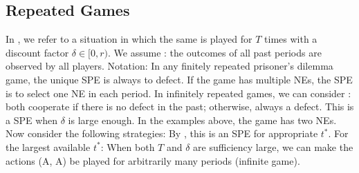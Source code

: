 \documentclass[10pt]{report}
\begin{document}
\subsection{Repeated Games}

In , we refer to a situation in which the same  is played for $T$ times with a discount factor $\delta\in[0,r)$. 
We assume : the outcomes of all past periods are observed by all players. Notation:
In any finitely repeated prisoner's dilemma game, the unique SPE is always to defect. If the game has multiple NEs, the SPE is to select one NE in each period. 
In infinitely repeated games, we can consider : both cooperate if there is no defect in the past; otherwise, always a defect. This is a SPE when $\delta$ is large enough. 
In the examples above, the game has two NEs. Now consider the following strategies:
By , this is an SPE for appropriate $t^*$. For the largest available $t^*$:
When both $T$ and $\delta$ are sufficiency large, we can make the actions (A, A) be played for arbitrarily many periods (infinite game). 
\end{document}
